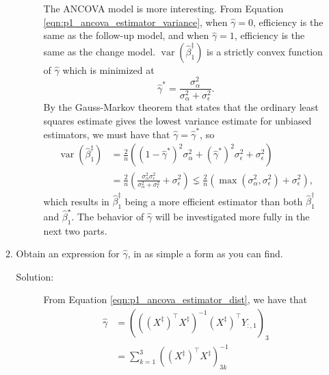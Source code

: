\documentclass[letterpaper,11pt]{article}
\begin{document}
\begin{enumerate}
\begin{enumerate}
\begin{description}
      The ANCOVA model is more interesting. From Equation
      \ref{eqn:p1_ancova_estimator_variance}, when $\hat{\gamma} = 0$,
      efficiency is the same as the follow-up model, and when
      $\hat{\gamma} = 1$, efficiency is the same as the change model.
      $\operatorname{var}\left(\hat{\beta}_1^\ddagger\right)$ is a strictly
      convex function of $\hat{\gamma}$ which is minimized at
      \begin{equation}
        \hat{\gamma}^* = \frac{\sigma_\alpha^2}{\sigma_\alpha^2 + \sigma_\epsilon^2}.
        \label{eqn:p1_gamma_hat_optimal}
      \end{equation}
      By the Gauss-Markov theorem that states that the ordinary least squares
      estimate gives the lowest variance estimate for unbiased estimators, we
      must have that $\hat{\gamma} = \hat{\gamma}^*$, so
      \begin{align}
        \operatorname{var}\left(\hat{\beta}_1^\ddagger\right)
        &=
        \frac{2}{n}\left(
          \left(1 - \hat{\gamma}^*\right)^2\sigma_\alpha^2 +
          \left(\hat{\gamma}^*\right)^2\sigma_\epsilon^2 + \sigma_\epsilon^2
          \right) \nonumber \\
        &= \frac{2}{n}\left(
          \frac{\sigma_\alpha^2\sigma_\epsilon^2}{\sigma_\alpha^2 + \sigma_\epsilon^2}
          +
          \sigma_\epsilon^2
          \right) 
        \lneq \frac{2}{n}\left(
          \max\left(\sigma_\alpha^2, \sigma_\epsilon^2\right) + \sigma_\epsilon^2
          \right),
          \label{eqn:p1_ancova_estimaor_variance_final}
      \end{align}            
      which results in $\hat{\beta}_1^\ddagger$ being a more efficient estimator
      than both $\hat{\beta}_1^\dagger$ and $\hat{\beta}_1^\star$. The behavior
      of $\hat{\gamma}$ will be investigated more fully in the next two parts.
    \end{description}
  \item Obtain an expression for $\hat{\gamma}$, in as simple a form as you can
    find.
    \begin{description}
    \item[Solution:] From Equation \ref{eqn:p1_ancova_estimator_dist}, we have that
      \begin{align}
        \hat{\gamma}
        &= \left(\left(\left(X^\ddagger\right)^\intercal X^\ddagger\right)^{-1}\left(X^\ddagger\right)^\intercal Y_{:,1}\right)_3 \label{eqn:p1_gamma_hat}\\
        &= \sum_{k=1}^3 \left(\left(X^\ddagger\right)^\intercal X^\ddagger\right)^{-1}_{3k}

\end{align}
\end{description}
\end{enumerate}
\end{enumerate}
\end{document}
